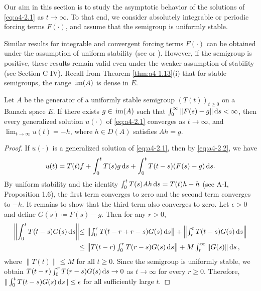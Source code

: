 Our aim in this section is to study the asymptotic behavior of the solutions of \eqref{eq:a4-2.1} as $t \to \infty$. 
To that end, we consider absolutely integrable or periodic forcing terms $F(\cdot)$, and assume that the semigroup
is uniformly stable.

Similar results for integrable and convergent forcing terms $F(\cdot)$ can
be obtained under the assumption of uniform stability (see \citet[p.119]{pazy:1983} or \citet{neubrander:1985b}). 
However, if the
semigroup is positive, these results remain valid even under the weaker assumption of stability (see Section C-IV).
Recall from Theorem \ref{thm:a4-1.13}(i) that for stable
semigroups, the range $\mathop{}\mathrm{im}(A)$ is dense in $E$.

\begin{theorem}\label{thm:a4-2.1}
Let $A$ be the generator of a uniformly stable semigroup
$(T(t))_{t \geq 0}$ on a Banach space $E$. 
If there exists $g \in \mathop{}\mathrm{im}(A)$ such that
$\int_{0}^{\infty} \|F(s) - g\|  \mathop{}\!\mathrm{d}{s} < \infty$, then every generalized solution $u(\cdot)$ of
\eqref{eq:a4-2.1} converges as $t \to \infty$, and $\lim_{t \to \infty} u(t) = -h$, where $h \in D(A)$ satisfies
$Ah = g$.
\end{theorem}

\begin{proof}
If $u(\cdot)$ is a generalized solution of \eqref{eq:a4-2.1}, then by \eqref{eq:a4-2.2}, we have
\[
u(t) = T(t)f + \int_{0}^{t} T(s)g  \mathop{}\!\mathrm{d}{s} + \int_{0}^{t} T(t-s)(F(s)-g)  \mathop{}\!\mathrm{d}{s}.
\]
By uniform
stability and the identity $\int_0^t T(s)Ah \mathop{}\!\mathrm{d}{s} = T(t)h - h$ (see A-I, Proposition 1.6), the first term converges to zero
and the second term converges to $-h$. 
It remains to show that the
third term also converges to zero. 
Let $\epsilon > 0$ and define $G(s) \coloneqq F(s)-g$. 
Then for any $r>0$,
\begin{align*}
\left\|\int_{0}^{t} T(t-s)G(s)  \mathop{}\!\mathrm{d}{s}\right\| & 
\textstyle{\leq \left\|\int_{0}^{r} T(t-r+r-s)G(s)  \mathop{}\!\mathrm{d}{s}\right\| + \left\|\int_{r}^{t} T(t-s)G(s)  \mathop{}\!\mathrm{d}{s}\right\|}\\
& 
\textstyle{\leq \left\|T(t-r)\int_{0}^{r} T(r-s)G(s)  \mathop{}\!\mathrm{d}{s}\right\| + M \int_{r}^{\infty} \|G(s)\|  \mathop{}\!\mathrm{d}{s}\,},
\end{align*}
where $\|T(t)\|\le M$ for all $t\ge 0$. Since the semigroup is uniformly stable, we obtain
$T(t-r)\int_{0}^{r} T(r-s)G(s)  \mathop{}\!\mathrm{d}{s} \to 0$ as $t \to \infty$ for every $r \geq 0$.
Therefore, $\|\int_{0}^{t} T(t-s)G(s)  \mathop{}\!\mathrm{d}{s}\| \leq \epsilon$ for all sufficiently large $t$.
\end{proof}


